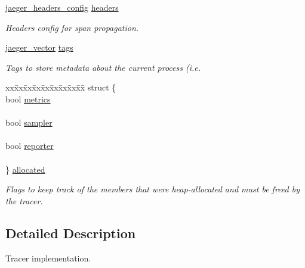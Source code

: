 \begin{DoxyCompactItemize}
\mbox{\hyperlink{structjaeger__headers__config}{jaeger\+\_\+headers\+\_\+config}} \mbox{\hyperlink{structjaeger__tracer_adfcabc1df77962918610907797229e0d}{headers}}
\begin{DoxyCompactList}\small\item\em Headers config for span propagation. \end{DoxyCompactList}\item 
\mbox{\hyperlink{structjaeger__vector}{jaeger\+\_\+vector}} \mbox{\hyperlink{structjaeger__tracer_a6e776148ebfb95dc49bbf018b58841e5}{tags}}
\begin{DoxyCompactList}\small\item\em Tags to store metadata about the current process (i.\+e. \end{DoxyCompactList}\item 
\mbox{\label{structjaeger__tracer_a61b99abb9c413a2a36c3d8b77050c3e6}} 
\begin{tabbing}
xx\=xx\=xx\=xx\=xx\=xx\=xx\=xx\=xx\=\kill
struct \{\\
\>bool \mbox{\hyperlink{structjaeger__tracer_ad829501be0454a1ede7de6448d923705}{metrics}}\\
\>\\
\>bool \mbox{\hyperlink{structjaeger__tracer_a77efb5d19028805e0531787e7059dd39}{sampler}}\\
\>\\
\>bool \mbox{\hyperlink{structjaeger__tracer_a7d7447ff17fbafd8adf6e68dfba758e9}{reporter}}\\
\>\\
\} \mbox{\hyperlink{structjaeger__tracer_a61b99abb9c413a2a36c3d8b77050c3e6}{allocated}}\\

\end{tabbing}\begin{DoxyCompactList}\small\item\em Flags to keep track of the members that were heap-\/allocated and must be freed by the tracer. \end{DoxyCompactList}\end{DoxyCompactItemize}


\subsection{Detailed Description}
Tracer implementation. 

